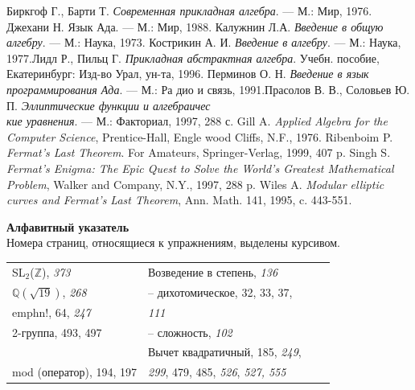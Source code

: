 \documentclass{mai_book}
\begin{document}
{\noindent[185] Биркгоф Г., Барти Т. {\itshape Современная прикладная алгебра}. — М.: Мир, 1976. \newline
[186]
Джехани Н. Язык Ада. — М.: Мир, 1988.
\newline
[187] Калужнин Л.А. {\itshape Введение в общую алгебру}. — М.: Наука, 1973. \newline
[188] Кострикин А. И. {\itshape Введение в алгебру}. — М.: Наука, 1977.\newline
[189] Лидл Р., Пильц Г. {\itshape Прикладная абстрактная алгебра}. Учебн. пособие, Екатеринбург: Изд-во Урал, ун-та, 1996. \newline
[190] Перминов О. Н. {\itshape Введение в язык программирования Ада}. — М.: Ра­ дио и связь, 1991.\newline
[191] Прасолов В. В., Соловьев Ю. П. {\itshape Эллиптические функции и алгебраичес\\кие уравнения}. — М.: Факториал, 1997, 288 с.
\newline
[192] Gill A. {\itshape Applied Algebra for the Computer Science}, Prentice-Hall, Engle­ wood Cliffs, N.F., 1976.
\newline
[193] Ribenboim P. {\itshape Fermat’s Last Theorem}. For Amateurs, Springer-Verlag, 1999, 407 p. \newline
[194] Singh S. {\itshape Fermat’s Enigma: The Epic Quest to Solve the World’s Greatest Mathematical Problem}, Walker and Company, N.Y., 1997, 288 p.
\newline
[195] Wiles A. {\itshape Modular elliptic curves and Fermat’s Last Theorem}, Ann. Math. 141, 1995, c. 443-551.

\newpage
\fancyhead{}
\thispagestyle{empty}
\hfill \break
\hfill \break
\hfill \break
\begin{center}
{\Large\textbf{Алфавитный указатель}} \\
\hfill \break
Номера страниц, относящиеся к упражнениям, выделены курсивом.
\end{center}


\begin{tabular}{llcc}
	SL$_{2}$($\mathbb{Z}$), {\itshape 373} & Возведение в степень, \emph{136} \\
	$\mathbb{Q}(\sqrt{19})$, {\itshape 268} & -- дихотомическое, 32, 33, 37, \\
	emph{n}!, 64, {\itshape 247} & \emph{111} \\
	 2-группа, 493, 497 & -- сложность, {\itshape 102} \\
	& Вычет квадратичный, 185, \emph{249}, \\ 
	mod (оператор), 194, 197 & \emph{299}, 479, 485, {\itshape 526}, {\itshape 527, 555}\\ 
	

\end{tabular}}
\end{document}
